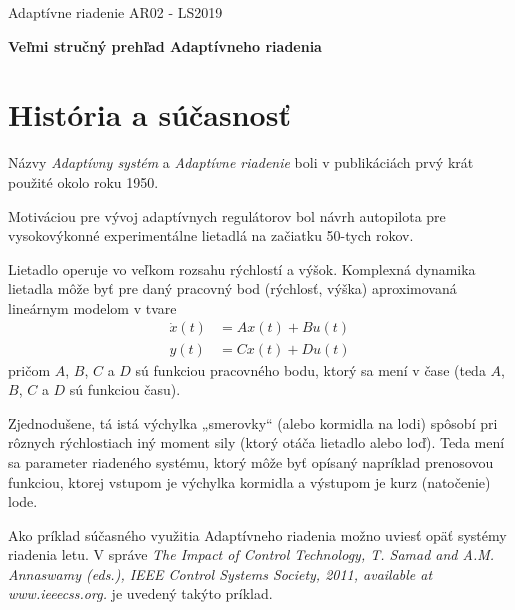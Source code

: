 \documentclass[a4paper, 10pt, ]{article}
\def\oznacenieCasti{AR02 - LS2019}
\begin{document}
\fontsize{12pt}{22pt}\selectfont

\centerline{\textsf{Adaptívne riadenie} \hfill \textsf{\oznacenieCasti}}

\fontsize{18pt}{22pt}\selectfont





\begin{flushleft}
	\textbf{\textsf{Veľmi stručný prehľad Adaptívneho riadenia}}
\end{flushleft}





\normalsize

\bigskip

\tableofcontents

\bigskip

\vspace{18pt}




\section{História a súčasnosť}

Názvy \emph{Adaptívny systém} a \emph{Adaptívne riadenie} boli v publikáciách prvý krát použité okolo roku 1950.

Motiváciou pre vývoj adaptívnych regulátorov bol návrh autopilota pre vysokovýkonné experimentálne lietadlá na začiatku 50-tych rokov.

Lietadlo operuje vo veľkom rozsahu rýchlostí a výšok. Komplexná dynamika lietadla môže byť pre daný pracovný bod (rýchlosť, výška) aproximovaná lineárnym modelom v tvare
\begin{align}
	\dot{x}(t) &= A x(t) + B u(t)  \\
	y(t) &= C x(t) + D u(t)
\end{align}
pričom $A$, $B$, $C$ a $D$ sú funkciou pracovného bodu, ktorý sa mení v čase (teda $A$, $B$, $C$ a $D$ sú funkciou času).

Zjednodušene, tá istá výchylka „smerovky“ (alebo kormidla na lodi) spôsobí pri rôznych rýchlostiach iný moment sily (ktorý otáča lietadlo alebo loď). Teda mení sa parameter riadeného systému, ktorý môže byť opísaný napríklad prenosovou funkciou, ktorej vstupom je výchylka kormidla a výstupom je kurz (natočenie) lode.

\bigskip

\noindent
Ako príklad súčasného využitia Adaptívneho riadenia možno uviesť opäť systémy riadenia letu. V správe \emph{The Impact of Control Technology, T. Samad and A.M. Annaswamy (eds.), IEEE Control Systems Society, 2011, available at www.ieeecss.org.} je uvedený takýto príklad.
\end{document}
